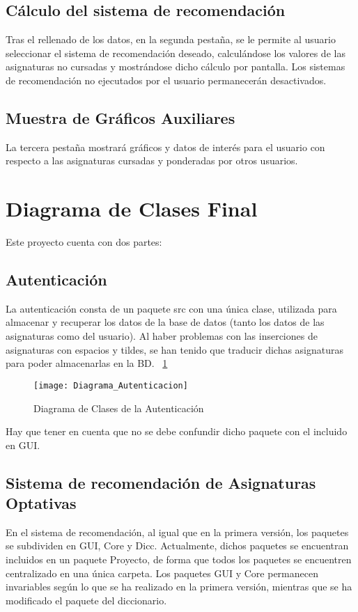 \subsection{Cálculo del sistema de recomendación}
Tras el rellenado de los datos, en la segunda pestaña, se le permite al usuario seleccionar el sistema de recomendación deseado, calculándose los valores de las asignaturas no cursadas y mostrándose dicho cálculo por pantalla. Los sistemas de recomendación no ejecutados por el usuario permanecerán desactivados. 
\subsection{Muestra de Gráficos Auxiliares}
La tercera pestaña mostrará gráficos y datos de interés para el usuario con respecto a las asignaturas cursadas y ponderadas por otros usuarios. 


\section{Diagrama de Clases Final}
Este proyecto cuenta con dos partes: 
\subsection{Autenticación}
La autenticación consta de un paquete src con una única clase, utilizada para almacenar y recuperar los datos de la base de datos (tanto los datos de las asignaturas como del usuario). 
Al haber problemas con las inserciones de asignaturas con espacios y tildes, se han tenido que traducir dichas asignaturas para poder almacenarlas en la BD. ~\ref{fig:C.4.1}
\begin{figure}[h]
\centering
\texttt{[image: Diagrama\_Autenticacion]}
\caption{Diagrama de Clases de la Autenticación}
\label{fig:C.4.1}
\end{figure}
Hay que tener en cuenta que no se debe confundir dicho paquete con el incluido en GUI.

\subsection{Sistema de recomendación de Asignaturas Optativas}
En el sistema de recomendación, al igual que en la primera versión, los paquetes se subdividen en GUI,  Core y Dicc. Actualmente, dichos paquetes se encuentran incluidos en un paquete Proyecto, de forma que todos los paquetes se encuentren centralizado  en una única carpeta. Los paquetes GUI y Core permanecen invariables según lo que se ha realizado en la primera versión, mientras que se ha modificado el paquete del diccionario. 

